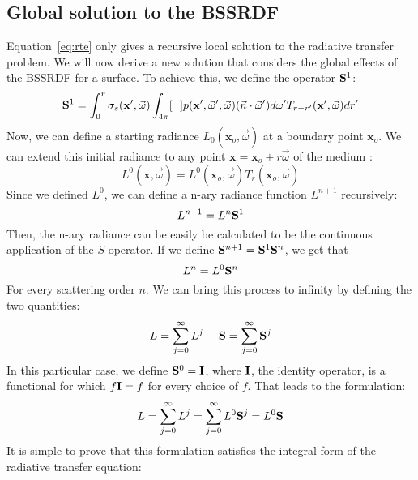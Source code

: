 \subsection{Global solution to the BSSRDF}
Equation~\ref{eq:rte} only gives a recursive local solution to the radiative transfer problem. We will now derive a new solution that considers the global effects of the BSSRDF for a surface.  To achieve this, we define the operator $\mathbf{S}^1$:
\begin{equation*}
\mathbf{S}^1 = \int_0^r \sigma_s(\mathbf{x}', \vec{\omega}) \int_{4\pi} [\ \ ] p(\mathbf{x}', \vec{\omega}', \vec{\omega})  (\vec{n} \cdot \vec{\omega}')  d\omega' T_{r-r'}(\mathbf{x}', \vec{\omega})  dr'
\end{equation*}
Now, we can define a starting radiance $L_0(\mathbf{x}_o, \vec{\omega})$ at a boundary point $\mathbf{x}_o$. We can extend this initial radiance to any point $\mathbf{x} = \mathbf{x}_o + r \vec{\omega}$ of the medium :
\begin{equation*}
L^0(\mathbf{x}, \vec{\omega}) = L^0(\mathbf{x}_o, \vec{\omega}) T_r(\mathbf{x}_o, \vec{\omega})
\end{equation*}
Since we defined $L^0$, we can define a n-ary radiance function $L^{n+1}$ recursively:
\begin{equation*}
L^{n+1} = L^n \mathbf{S}^1
\end{equation*}
Then, the n-ary radiance can be easily be calculated to be the continuous application of the $S$ operator. If we define $\mathbf{S}^{n+1} = \mathbf{S}^1 \mathbf{S}^n$, we get that 
\begin{equation*}
L^n = L^0 \mathbf{S}^n
\end{equation*}
For every scattering order $n$.
We can bring this process to infinity by defining the two quantities:
\begin{equation*}
L = \sum_{j=0}^\infty L^j\ \ \ \ \operator{S} = \sum_{j=0}^\infty \operator{S}^j
\end{equation*}
In this particular case, we define $\mathbf{S}^0 = \mathbf{I}$, where $\mathbf{I}$, the identity operator, is a functional for which $f \mathbf{I} = f$ for every choice of $f$.
That leads to the formulation:
\begin{equation*}
L =  \sum_{j=0}^\infty L^j = \sum_{j=0}^\infty L^0 \mathbf{S}^j = L^0 \mathbf{S}
\end{equation*}
It is simple to prove that this formulation satisfies the integral form of the radiative transfer equation:

